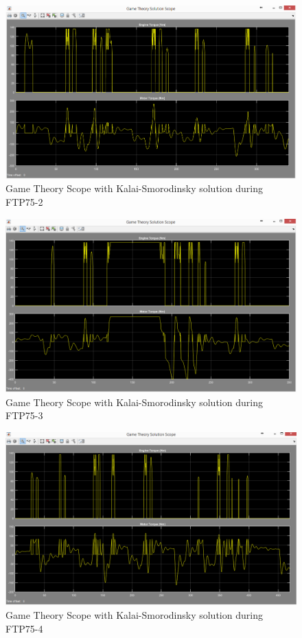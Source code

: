 \begin{figure}[h]
\centering
\includegraphics[scale=0.4]{figures/KalaiSmorodinsky/FTP75-2/gameTheory23Juni}
\caption{Game Theory Scope with Kalai-Smorodinsky solution during FTP75-2}
\label{fig:gtks2}
\end{figure}

\begin{figure}[h]
\centering
\includegraphics[scale=0.4]{figures/KalaiSmorodinsky/FTP75-3/gameTheory25Juni}
\caption{Game Theory Scope with Kalai-Smorodinsky solution during FTP75-3}
\label{fig:gtks3}
\end{figure}

\begin{figure}[h]
\centering
\includegraphics[scale=0.4]{figures/KalaiSmorodinsky/FTP75-4/gameTheory25Juni}
\caption{Game Theory Scope with Kalai-Smorodinsky solution during FTP75-4}
\label{fig:gtks4}
\end{figure}

